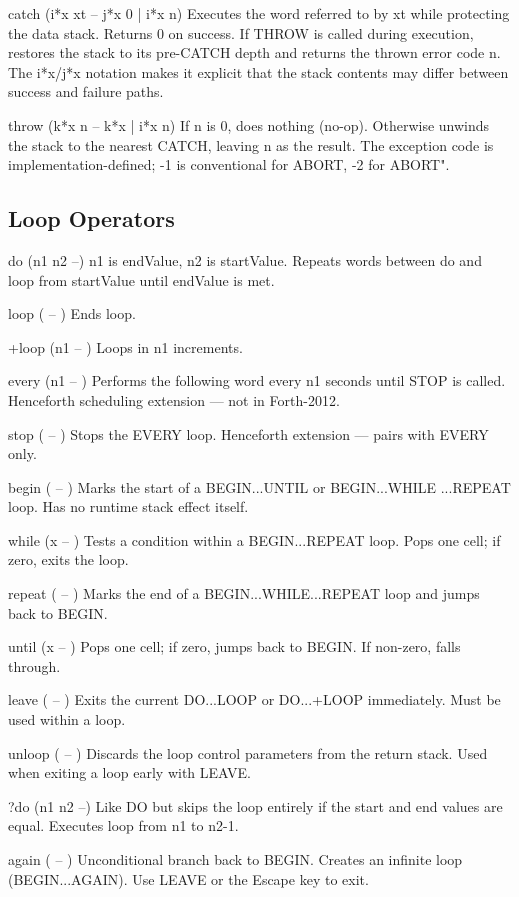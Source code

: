 \documentclass[a4paper, 11pt, openany]{book}
\begin{document}
\begin{forthbox}
  catch  (i*x xt -- j*x 0 | i*x n)
         Executes the word referred to by xt while protecting the
         data stack. Returns 0 on success. If THROW is called
         during execution, restores the stack to its pre-CATCH
         depth and returns the thrown error code n. The i*x/j*x
         notation makes it explicit that the stack contents may
         differ between success and failure paths.

  throw  (k*x n -- k*x | i*x n)
         If n is 0, does nothing (no-op). Otherwise unwinds the
         stack to the nearest CATCH, leaving n as the result.
         The exception code is implementation-defined; -1 is
         conventional for ABORT, -2 for ABORT".
\end{forthbox}

\subsection{Loop Operators}

\begin{forthbox}
  do     (n1 n2 --)
         n1 is endValue, n2 is startValue. Repeats words between
         do and loop from startValue until endValue is met.

  loop   ( -- )
         Ends loop.

  +loop  (n1 -- )
         Loops in n1 increments.

  every  (n1 -- )
         Performs the following word every n1 seconds until STOP
         is called. Henceforth scheduling extension --- not in
         Forth-2012.

  stop   ( -- )
         Stops the EVERY loop. Henceforth extension --- pairs
         with EVERY only.

  begin  ( -- )
         Marks the start of a BEGIN...UNTIL or BEGIN...WHILE
         ...REPEAT loop. Has no runtime stack effect itself.

  while  (x -- )
         Tests a condition within a BEGIN...REPEAT loop. Pops
         one cell; if zero, exits the loop.

  repeat ( -- )
         Marks the end of a BEGIN...WHILE...REPEAT loop and
         jumps back to BEGIN.

  until  (x -- )
         Pops one cell; if zero, jumps back to BEGIN. If non-zero,
         falls through.

  leave  ( -- )
         Exits the current DO...LOOP or DO...+LOOP immediately.
         Must be used within a loop.

  unloop ( -- )
         Discards the loop control parameters from the return
         stack. Used when exiting a loop early with LEAVE.

  ?do    (n1 n2 --)
         Like DO but skips the loop entirely if the start and
         end values are equal. Executes loop from n1 to n2-1.

  again  ( -- )
         Unconditional branch back to BEGIN. Creates an infinite
         loop (BEGIN...AGAIN). Use LEAVE or the Escape key to
         exit.
\end{forthbox}
\end{document}
